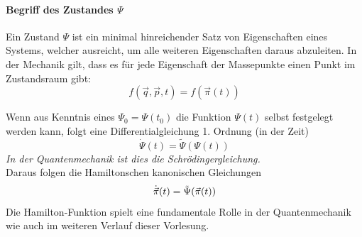 \paragraph{Begriff des Zustandes $\Psi$}
Ein Zustand $\Psi$ ist ein minimal hinreichender Satz von Eigenschaften eines Systems, welcher ausreicht, um alle weiteren Eigenschaften daraus abzuleiten. In der Mechanik gilt, dass es für jede Eigenschaft der Massepunkte einen Punkt im Zustandsraum gibt: 
$$f(\vec{q}, \vec{p}, t) = f(\vec{\pi}(t))$$


Wenn aus Kenntnis eines $\Psi_0 = \Psi(t_0)$ die Funktion $\Psi(t)$ selbst festgelegt werden kann, folgt eine Differentialgleichung 1. Ordnung (in der Zeit)
$$\dot{\Psi}(t) = \tilde{\Psi}(\Psi(t))$$
\textit{In der Quantenmechanik ist dies die Schrödingergleichung.}\\
Daraus folgen die Hamiltonschen kanonischen Gleichungen
$$\dot{\vec{\pi}} (t) = \tilde{\Psi}(\vec{\pi}(t))$$
Die Hamilton-Funktion spielt eine fundamentale Rolle in der Quantenmechanik wie auch im weiteren Verlauf dieser Vorlesung.

\newcommand{\vpi}{\vec{\pi}}
\newcommand{\poisson}[1]{\{#1\}_{\vec{p}, \vec{q}}}
